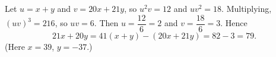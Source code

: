 Let $u=x+y$ and $v=20x+21y$, so $u^2v=12$ and $uv^2=18$. Multiplying, $(uv)^3=216$, so $uv=6$. Then $u=\dfrac{12}{6}=2$ and $v=\dfrac{18}{6}=3$. Hence
\[21x+20y=41(x+y)-(20x+21y)=82-3=\boxed{79}.\]
(Here $x=39$, $y=-37$.)
